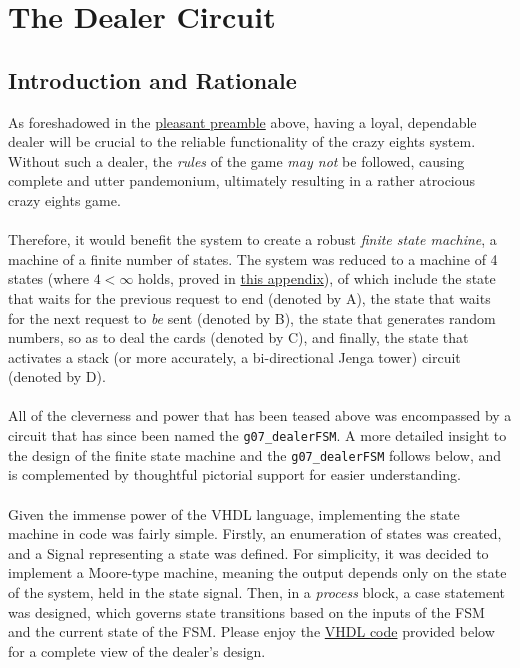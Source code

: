 \documentclass[12pt]{report}
\begin{document}

\part{The Dealer Circuit}

\chapter*{Introduction and Rationale}
\label{s:intro1}
As foreshadowed in the \hyperref[s:preamble]{pleasant preamble} above, having a loyal, dependable
dealer will be crucial to the reliable functionality of the crazy eights system. Without such a
dealer, the \textit{rules} of the game \textit{may not} be followed, causing complete and utter
pandemonium, ultimately resulting in a rather atrocious crazy eights game.\\\\
Therefore, it would benefit the system to create a robust \textit{finite state machine}, a machine
of a finite number of states. The system was reduced to a machine of 4 states (where $4 < \infty$
holds, proved in \hyperref[a:proof]{this appendix}), of which include the state that waits for the
previous request to end (denoted by A), the state
that waits for the next request to \textit{be} sent (denoted by B), the state that generates
random numbers, so as to deal the cards (denoted by C), and finally, the state that activates a
stack (or more accurately, a bi-directional Jenga tower) circuit (denoted by D). \\\\
All of the cleverness and power that has been teased above was encompassed by a circuit that has
since been named the \texttt{g07\_dealerFSM}. A more detailed insight to the design of the finite
state machine and the \texttt{g07\_dealerFSM} follows below, and is complemented by thoughtful
pictorial support for easier understanding.\\\\
Given the immense power of the VHDL language, implementing the state machine in code was fairly
simple. Firstly, an enumeration of states was created, and a Signal representing a state was
defined. For simplicity, it was decided to implement a Moore-type machine, meaning the output
depends only on the state of the system, held in the state signal. Then, in a \textit{process}
block, a case statement was designed, which governs state transitions based on the inputs of the FSM
and the current state of the FSM. Please enjoy the \hyperref[s:vhdl]{VHDL code} provided below for a
complete view of the dealer's design.
\end{document}
